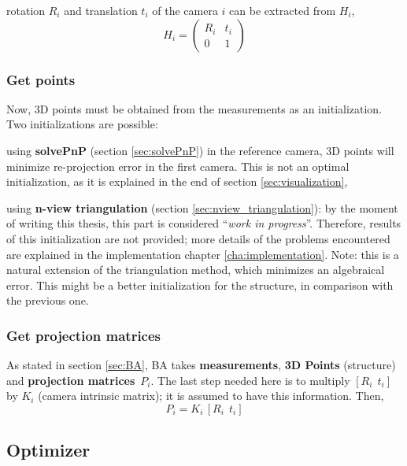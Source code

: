 rotation $R_i$ and translation $t_i$ of the camera $i$ can be extracted from $H_i$,
\begin{equation}
 H_i = \begin{pmatrix}
        R_i & t_i \\
        0   & 1
        \end{pmatrix}
\end{equation}

\subsubsection*{Get points}

Now, 3D points must be obtained from the measurements as an initialization. Two initializations are possible:
\begin{itemize*}
 \item using \textbf{solvePnP} (section \ref{sec:solvePnP}) in the reference camera, 3D points will minimize re-projection error in the first camera. This is not an optimal initialization, as it is explained in the end of section \ref{sec:visualization},

 \item using \textbf{n-view triangulation} (section \ref{sec:nview_triangulation}): by the moment of writing this thesis, this part is considered ``\textit{work in progress}''. Therefore, results of this initialization are not provided; more details of the problems encountered are explained in the implementation chapter \ref{cha:implementation}. Note: this is a natural extension of the triangulation method, which minimizes an algebraical error. This might be a better initialization for the structure, in comparison with the previous one.
\end{itemize*}



\subsubsection*{Get projection matrices}

As stated in section \ref{sec:BA}, BA takes \textbf{measurements}, \textbf{3D Points} (structure) and \textbf{projection matrices}~$P_i$. The last step needed here is to multiply $[R_i ~~ t_i]$ by $K_i$ (camera intrinsic matrix); it is assumed to have this information. Then,
\[
 P_i = K_i \, [R_i ~~ t_i]
\]


\subsection{Optimizer}

